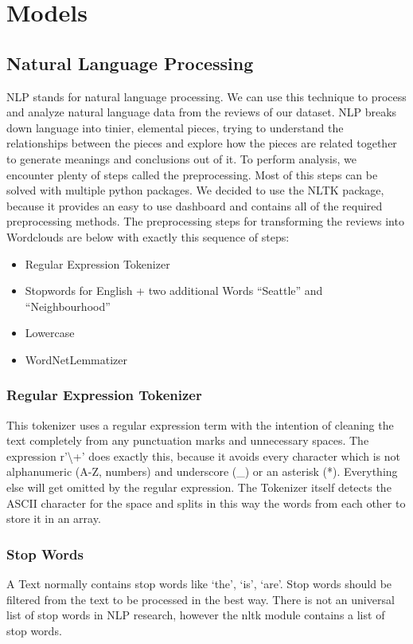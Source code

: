 \documentclass[journal]{IEEEtran}
\begin{document}
\section{Models}
\subsection{Natural Language Processing}
\noindent NLP stands for natural language processing. We can use this technique to process and analyze natural language data from the reviews of our dataset. NLP breaks down language into tinier, elemental pieces, trying to understand the relationships between the pieces and explore how the pieces are related together to generate meanings and conclusions out of it. To perform analysis, we encounter plenty of steps called the preprocessing. Most of this steps can be solved with multiple python packages. We decided to use the NLTK package, because it provides an easy to use dashboard and contains all of the required preprocessing methods.
The preprocessing steps for transforming the reviews into Wordclouds are below with exactly this sequence of steps:
\begin{itemize}
 \item Regular Expression Tokenizer
 \item Stopwords for English + two additional Words “Seattle” and “Neighbourhood”
 \item Lowercase
 \item WordNetLemmatizer
\end{itemize}

\subsubsection{Regular Expression Tokenizer}
\noindent This  tokenizer uses a regular expression term with the intention of cleaning the text completely from any punctuation marks and unnecessary spaces.  The expression r'\textbackslash +' does exactly this, because it avoids every character which is not alphanumeric (A-Z, numbers) and underscore (\_) or an asterisk (*). Everything else will get omitted by the regular expression. The Tokenizer itself detects the ASCII character for the space and splits in this way the words from each other to store it in an array.

\subsubsection{Stop Words}
\noindent A Text normally contains stop words like ‘the’, ‘is’, ‘are’. Stop words should be filtered from the text to be processed in the best way. There is not an universal list of stop words in NLP research, however the nltk module contains a list of stop words.
\end{document}
